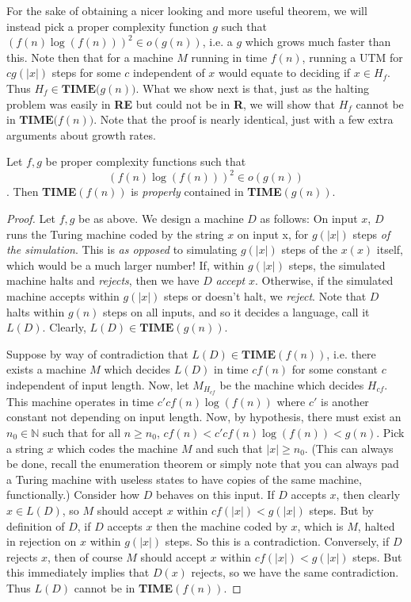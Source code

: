 \par For the sake of obtaining a nicer looking and more useful theorem, we will instead pick a proper complexity function $g$ such that $(f(n)\log(f(n)))^2 \in o(g(n))$, i.e. a $g$ which grows much faster than this. Note then that for a machine $M$ running in time $f(n)$, running a UTM for $cg(|x|)$ steps for some $c$ independent of $x$ would equate to deciding if $x \in H_f$. Thus $H_f \in \textbf{TIME($g(n)$)}$. What we show next is that, just as the halting problem was easily in \textbf{RE} but could not be in \textbf{R}, we will show that $H_f$ cannot be in $\textbf{TIME($f(n)$)}$. Note that the proof is nearly identical, just with a few extra arguments about growth rates.
\begin{theorem}
	Let $f,g$ be proper complexity functions such that \[ (f(n)\log(f(n)))^2 \in o(g(n)) \]. Then \textbf{TIME}$(f(n))$ is \textit{properly} contained in \textbf{TIME}$(g(n))$.
\end{theorem} 
\begin{proof}
	Let $f,g$ be as above. We design a machine $D$ as follows: On input $x$, $D$ runs the Turing machine coded by the string $x$ on input x, for $g(|x|)$ steps \textit{of the simulation}. This is \textit{as opposed} to simulating $g(|x|)$ steps of the $x(x)$ itself, which would be a much larger number! If, within $g(|x|)$ steps, the simulated machine halts and \textit{rejects}, then we have $D$ \textit{accept} $x$. Otherwise, if the simulated machine accepts within $g(|x|)$ steps or doesn't halt, we \textit{reject}. Note that $D$ halts within $g(n)$ steps on all inputs, and so it decides a language, call it $L(D)$. Clearly, $L(D) \in \textbf{TIME}(g(n))$. 
	\par Suppose by way of contradiction that $L(D) \in \textbf{TIME}(f(n))$, i.e. there exists a machine $M$ which decides $L(D)$ in time $cf(n)$ for some constant $c$ independent of input length. 
	Now, let $M_{H_{cf}}$ be the machine which decides $H_{cf}$. This machine operates in time $c'cf(n)\log(f(n))$ where $c'$ is another constant not depending on input length. 
	Now, by hypothesis, there must exist an $n_0 \in \mathbb{N}$ such that for all $n \geq n_0$, $cf(n) < c'cf(n)\log(f(n)) < g(n)$. Pick a string $x$ which codes the machine $M$ and such that $|x| \geq n_0$. (This can always be done, recall the enumeration theorem or simply note that you can always pad a Turing machine with useless states to have copies of the same machine, functionally.) Consider how $D$ behaves on this input.
	 If $D$ accepts $x$, then clearly $x \in L(D)$, so $M$ should accept $x$ within $cf(|x|) < g(|x|)$ steps. But by definition of $D$, if $D$ accepts $x$ then the machine coded by $x$, which is $M$, halted in rejection on $x$ within $g(|x|)$ steps. So this is a contradiction. Conversely, if $D$ rejects $x$, then of course $M$ should accept $x$ within $cf(|x|) < g(|x|)$ steps. But this immediately implies that $D(x)$ rejects, so we have the same contradiction. Thus $L(D)$ cannot be in \textbf{TIME}$(f(n))$.
\end{proof}
